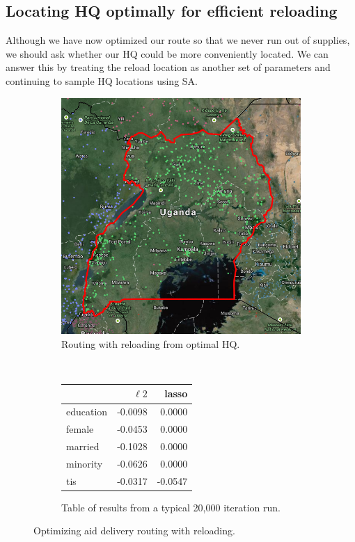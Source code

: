 \documentclass[a0,final]{a0poster}
\begin{document}
\begin{multicols}{3}
\subsection*{Locating HQ optimally for efficient reloading}

Although we have now optimized our route so that we never run out of supplies, we should ask whether our HQ could be more conveniently located. We can answer this by treating the reload location as another set of parameters and continuing to sample HQ locations using SA.

\begin{figure}[H]
  \centering
  \begin{subfigure}[b]{0.4\columnwidth}
    \centering
    \includegraphics[width=\textwidth]{../write-up/figures/uganda}
    \caption{Routing with reloading from optimal HQ.}
    \label{fig:b1}
  \end{subfigure}~\begin{subfigure}[b]{0.5\columnwidth}
    \centering
		\begin{tabular}{lrr}
		\toprule
		{} &        $\ell2$ &     lasso \\
		\midrule
		education & -0.0098 &  0.0000 \\
		female    & -0.0453 &  0.0000 \\
		married   & -0.1028 &  0.0000 \\
		minority  & -0.0626 &  0.0000 \\
		tis       & -0.0317 & -0.0547 \\
		\bottomrule
		\end{tabular}
    \caption{Table of results from a typical 20,000 iteration run.}
    \label{fig:b2}
  \end{subfigure}
  \caption{Optimizing aid delivery routing with reloading.}
\end{figure}


\end{multicols}
\end{document}
